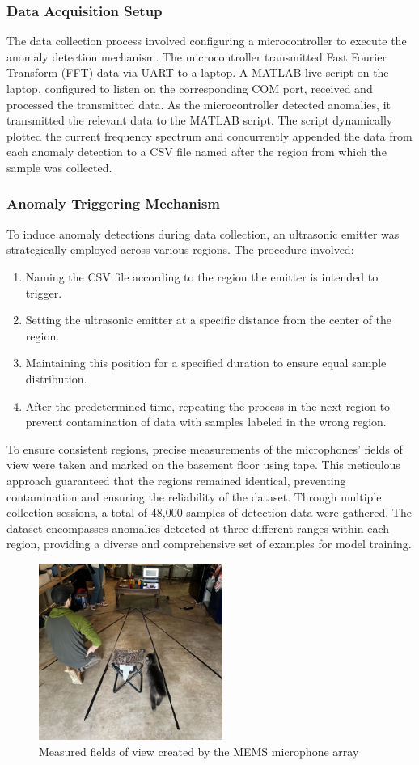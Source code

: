 \documentclass[conference]{IEEEtran}
\begin{document}
\subsubsection{Data Acquisition Setup}
The data collection process involved configuring a microcontroller to execute the anomaly detection mechanism. The microcontroller transmitted Fast Fourier Transform (FFT) data via UART to a laptop. A MATLAB live script on the laptop, configured to listen on the corresponding COM port, received and processed the transmitted data. As the microcontroller detected anomalies, it transmitted the relevant data to the MATLAB script. The script dynamically plotted the current frequency spectrum and concurrently appended the data from each anomaly detection to a CSV file named after the region from which the sample was collected.
\subsubsection{Anomaly Triggering Mechanism}
To induce anomaly detections during data collection, an ultrasonic emitter was strategically employed across various regions. The procedure involved:
\begin{enumerate}
    \item Naming the CSV file according to the region the emitter is intended to trigger.
    \item Setting the ultrasonic emitter at a specific distance from the center of the region.
    \item Maintaining this position for a specified duration to ensure equal sample distribution.
    \item After the predetermined time, repeating the process in the next region to prevent contamination of data with samples labeled in the wrong region.
\end{enumerate}
To ensure consistent regions, precise measurements of the microphones' fields of view were taken and marked on the basement floor using tape. This meticulous approach guaranteed that the regions remained identical, preventing contamination and ensuring the reliability of the dataset. Through multiple collection sessions, a total of 48,000 samples of detection data were gathered. The dataset encompasses anomalies detected at three different ranges within each region, providing a diverse and comprehensive set of examples for model training.
\begin{figure}[htbp]
    \centering
    \includegraphics[width=6cm]{figs/nn/datacollectionregionslive_cropped.png} %
    \caption{Measured fields of view created by the MEMS microphone array}
    \label{fig2}
\end{figure}
\end{document}
